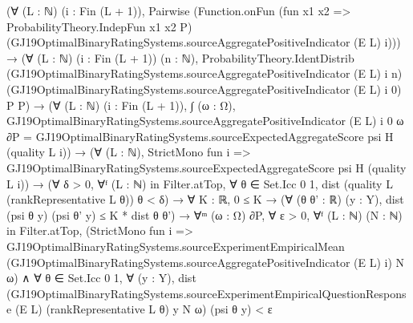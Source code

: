 \documentclass[10pt]{article}
\begin{document}
\begin{ReviewVerbatim}
                      (∀ (L : ℕ) (i : Fin (L + 1)),
                          Pairwise
                            (Function.onFun (fun x1 x2 => ProbabilityTheory.IndepFun x1 x2 P)
                              (GJ19OptimalBinaryRatingSystems.sourceAggregatePositiveIndicator (E L) i))) →
                        (∀ (L : ℕ) (i : Fin (L + 1)) (n : ℕ),
                            ProbabilityTheory.IdentDistrib
                              (GJ19OptimalBinaryRatingSystems.sourceAggregatePositiveIndicator (E L) i n)
                              (GJ19OptimalBinaryRatingSystems.sourceAggregatePositiveIndicator (E L) i 0) P P) →
                          (∀ (L : ℕ) (i : Fin (L + 1)),
                              ∫ (ω : Ω),
                                  GJ19OptimalBinaryRatingSystems.sourceAggregatePositiveIndicator (E L) i 0 ω ∂P =
                                GJ19OptimalBinaryRatingSystems.sourceExpectedAggregateScore psi H (quality L i)) →
                            (∀ (L : ℕ),
                                StrictMono fun i =>
                                  GJ19OptimalBinaryRatingSystems.sourceExpectedAggregateScore psi H (quality L i)) →
                              (∀ δ > 0,
                                  ∀ᶠ (L : ℕ) in Filter.atTop,
                                    ∀ θ ∈ Set.Icc 0 1, dist (quality L (rankRepresentative L θ)) θ < δ) →
                                ∀ {K : ℝ},
                                  0 ≤ K →
                                    (∀ (θ θ' : ℝ) (y : Y), dist (psi θ y) (psi θ' y) ≤ K * dist θ θ') →
                                      ∀ᵐ (ω : Ω) ∂P,
                                        ∀ ε > 0,
                                          ∀ᶠ (L : ℕ) (N : ℕ) in Filter.atTop,
                                            (StrictMono fun i =>
                                                GJ19OptimalBinaryRatingSystems.sourceExperimentEmpiricalMean
                                                  (GJ19OptimalBinaryRatingSystems.sourceAggregatePositiveIndicator (E L)
                                                    i)
                                                  N ω) ∧
                                              ∀ θ ∈ Set.Icc 0 1,
                                                ∀ (y : Y),
                                                  dist
                                                      (GJ19OptimalBinaryRatingSystems.sourceExperimentEmpiricalQuestionResponse
                                                        (E L) (rankRepresentative L θ) y N ω)
                                                      (psi θ y) <
                                                    ε
\end{ReviewVerbatim}
\end{document}
